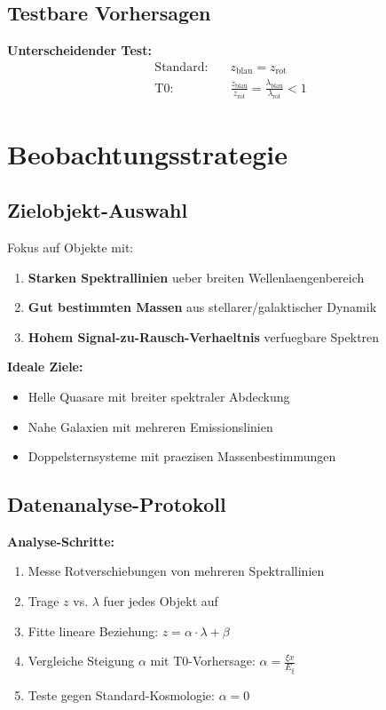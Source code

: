 \documentclass[12pt,a4paper]{article}
\newcommand{\Exi}{E_\xi}
\theoremstyle{definition}
\begin{document}
	\subsection{Testbare Vorhersagen}
	
	\begin{formel}
		\textbf{Unterscheidender Test:}
		\begin{align}
			\text{Standard:} \quad &z_{\text{blau}} = z_{\text{rot}} \\
			\text{T0:} \quad &\frac{z_{\text{blau}}}{z_{\text{rot}}} = \frac{\lambda_{\text{blau}}}{\lambda_{\text{rot}}} < 1
		\end{align}
	\end{formel}
	
	\section{Beobachtungsstrategie}
	
	\subsection{Zielobjekt-Auswahl}
	
	Fokus auf Objekte mit:
	\begin{enumerate}
		\item \textbf{Starken Spektrallinien} ueber breiten Wellenlaengenbereich
		\item \textbf{Gut bestimmten Massen} aus stellarer/galaktischer Dynamik
		\item \textbf{Hohem Signal-zu-Rausch-Verhaeltnis} verfuegbare Spektren
	\end{enumerate}
	
	\textbf{Ideale Ziele:}
	\begin{itemize}
		\item Helle Quasare mit breiter spektraler Abdeckung
		\item Nahe Galaxien mit mehreren Emissionslinien
		\item Doppelsternsysteme mit praezisen Massenbestimmungen
	\end{itemize}
	
	\subsection{Datenanalyse-Protokoll}
	
	\begin{experiment}
		\textbf{Analyse-Schritte:}
		\begin{enumerate}
			\item Messe Rotverschiebungen von mehreren Spektrallinien
			\item Trage $z$ vs. $\lambda$ fuer jedes Objekt auf
			\item Fitte lineare Beziehung: $z = \alpha \cdot \lambda + \beta$
			\item Vergleiche Steigung $\alpha$ mit T0-Vorhersage: $\alpha = \frac{\xi x}{\Exi}$
			\item Teste gegen Standard-Kosmologie: $\alpha = 0$
		\end{enumerate}
	\end{experiment}
	
\end{document}
